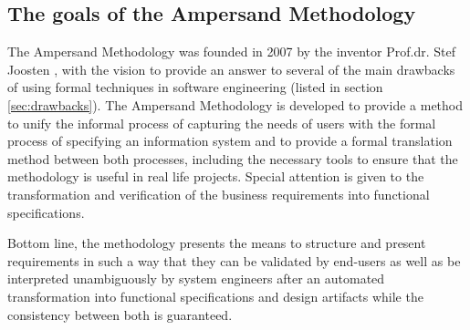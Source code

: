 \begin{description}
\end{description}


\subsection{The goals of the Ampersand Methodology}
   
The Ampersand Methodology was founded in 2007 by the inventor Prof.dr. Stef Joosten  , with the vision to provide an answer to several of the main drawbacks of using formal techniques  in software engineering (listed in section \autoref{sec:drawbacks}). 
The Ampersand Methodology is  developed to provide a method to unify the informal process of capturing the needs of users with the formal process of specifying an information system and to provide a formal translation method between both processes, including the necessary tools to ensure that the methodology is useful in real life projects.
Special attention is given to the transformation and verification of the business requirements into functional specifications.

Bottom line, the methodology presents the means to structure and present requirements in such a way that they can be validated by end-users as well as be interpreted unambiguously by system engineers after an automated transformation into functional specifications and design artifacts while the consistency between both is guaranteed.

